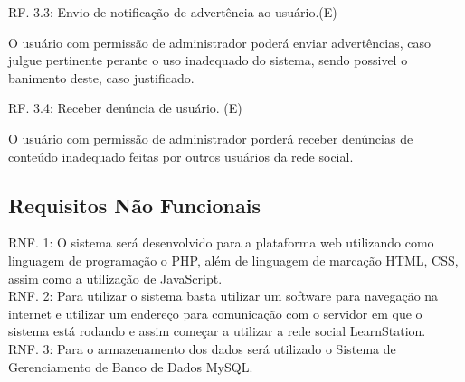 \documentclass[12pt,a4paper,onecolumn,titlepage]{article}
\begin{document}
\begin{description}
\item RF. 3.3: Envio de notificação de advertência ao usuário.(E)
\item \qquad O usuário com permissão de administrador poderá enviar advertências, caso julgue pertinente perante o uso inadequado do sistema, sendo possivel o banimento deste, caso justificado.

\item RF. 3.4: Receber denúncia de usuário. (E)
\item \qquad O usuário com permissão de administrador porderá receber denúncias de conteúdo inadequado feitas por outros usuários da rede social.


\end{description}

\subsection{Requisitos Não Funcionais}

\qquad RNF. 1: O sistema será desenvolvido para a plataforma web utilizando como linguagem de programação o PHP, além de linguagem de marcação HTML, CSS, assim como a utilização de JavaScript.\\

RNF. 2: Para utilizar o sistema basta utilizar um software para navegação na internet e utilizar um endereço para comunicação com o servidor em que o sistema está rodando e assim começar a utilizar a rede social LearnStation.\\

RNF. 3: Para o armazenamento dos dados será utilizado o Sistema de Gerenciamento de Banco de Dados MySQL.\\


\end{document}
